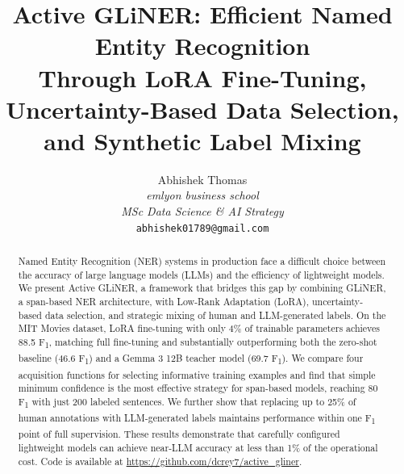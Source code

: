 \documentclass[11pt]{article}
\title{\LARGE\textbf{Active GLiNER: Efficient Named Entity Recognition\\[4pt]
Through LoRA Fine-Tuning, Uncertainty-Based Data Selection,\\[4pt]
and Synthetic Label Mixing}}
\author{
    \large Abhishek Thomas \\[2pt]
    \normalsize\textit{emlyon business school} \\
    \normalsize\textit{MSc Data Science \& AI Strategy} \\[2pt]
    \normalsize\texttt{abhishek01789@gmail.com}
}
\date{}
\newcommand{\fone}{F\textsubscript{1}}
\newcommand{\method}{Active GLiNER}
\begin{document}
\maketitle

\begin{abstract}
\noindent Named Entity Recognition (NER) systems in production face a difficult choice between the accuracy of large language models (LLMs) and the efficiency of lightweight models. We present \method{}, a framework that bridges this gap by combining GLiNER, a span-based NER architecture, with Low-Rank Adaptation (LoRA), uncertainty-based data selection, and strategic mixing of human and LLM-generated labels. On the MIT Movies dataset, LoRA fine-tuning with only 4\% of trainable parameters achieves 88.5 \fone{}, matching full fine-tuning and substantially outperforming both the zero-shot baseline (46.6 \fone{}) and a Gemma 3 12B teacher model (69.7 \fone{}). We compare four acquisition functions for selecting informative training examples and find that simple minimum confidence is the most effective strategy for span-based models, reaching 80 \fone{} with just 200 labeled sentences. We further show that replacing up to 25\% of human annotations with LLM-generated labels maintains performance within one \fone{} point of full supervision. These results demonstrate that carefully configured lightweight models can achieve near-LLM accuracy at less than 1\% of the operational cost. Code is available at \url{https://github.com/dcrey7/active_gliner}.
\end{abstract}

\vspace{4pt}
\end{document}
